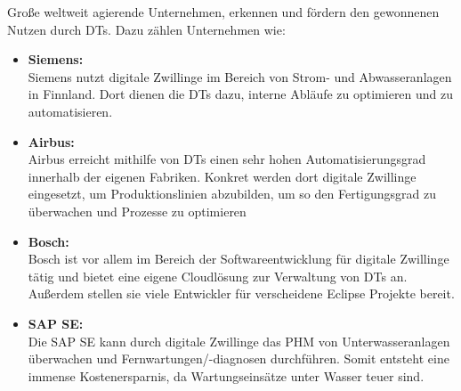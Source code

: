 \pagebreak

Große weltweit agierende Unternehmen, erkennen und fördern den gewonnenen Nutzen durch \ac{DT}s. Dazu zählen Unternehmen wie:
\begin{itemize}
    \item \textbf{Siemens:}\\ Siemens nutzt digitale Zwillinge im Bereich von Strom- und Abwasseranlagen in Finnland. Dort dienen die \ac{DT}s dazu, interne Abläufe zu optimieren und zu automatisieren.\autocite{tao2018digital}
    \item \textbf{Airbus:}\\ Airbus erreicht mithilfe von \ac{DT}s einen sehr hohen Automatisierungsgrad innerhalb der eigenen Fabriken. Konkret werden dort digitale Zwillinge eingesetzt, um Produktionslinien abzubilden, um so den Fertigungsgrad zu überwachen und Prozesse zu optimieren
    \item \textbf{Bosch:}\\ Bosch ist vor allem im Bereich der Softwareentwicklung für digitale Zwillinge tätig und bietet eine eigene Cloudlösung zur Verwaltung von \ac{DT}s an. Außerdem stellen sie viele Entwickler für verscheidene Eclipse Projekte bereit.
    \item \textbf{SAP SE:}\\ Die SAP SE kann durch digitale Zwillinge das \ac{PHM} von Unterwasseranlagen überwachen und Fernwartungen/-diagnosen durchführen. Somit entsteht eine immense Kostenersparnis, da Wartungseinsätze unter Wasser teuer sind.
\end{itemize}



